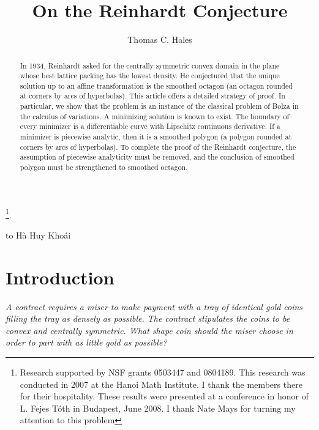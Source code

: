 \documentclass[11pt]{amsart}
\begin{document}
\title{On the Reinhardt Conjecture}
\author{Thomas C. Hales}
 \thanks{Research supported by NSF grants
  0503447 and 0804189.  This research was conducted in 2007 at the
  Hanoi Math Institute.  I thank the members there for their
  hospitality.  These results were presented at a
  conference in honor of L. Fejes T\'oth in Budapest, June 2008.  I
  thank Nate Mays for turning my attention to this problem}.


\begin{abstract}  
  In 1934, Reinhardt asked for the centrally symmetric convex domain
  in the plane whose best lattice packing has the lowest density.  He
  conjectured that the unique solution up to an affine transformation
  is the smoothed octagon (an octagon rounded at corners by arcs of
  hyperbolas).  This article offers a detailed strategy of proof.  In
  particular, we show that the problem is an instance of the classical
  problem of Bolza in the calculus of variations.  A minimizing
  solution is known to exist.  The boundary of every minimizer is a
  differentiable curve with Lipschitz continuous
  derivative.  If a minimizer is piecewise analytic, then it is a
  smoothed polygon (a polygon rounded at corners by arcs of
  hyperbolas).  To complete the proof of the Reinhardt conjecture, the
  assumption of piecewise analyticity must be removed, and the
  conclusion of smoothed polygon must be strengthened to smoothed
  octagon.
\end{abstract}

\maketitle





\centerline{to H\`a Huy Kho\'ai}

\section{Introduction}

{\narrower\it A contract requires a miser to make payment with a tray
  of identical gold coins filling the tray as densely as possible.
  The contract stipulates the coins to be convex and centrally
  symmetric.  What shape coin should the miser choose in order to part
  with as little gold as possible?}
\end{document}
